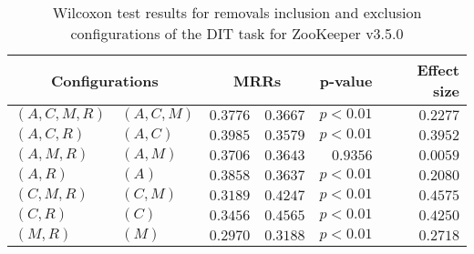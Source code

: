 
\begin{table}
\begin{spacing}{1.2}
\centering
\caption{Wilcoxon test results for removals inclusion and exclusion configurations of the DIT task for ZooKeeper v3.5.0}
\label{table:versus-wilcox-zookeeper-dit-removals}
\begin{tabular}{ll|rr|rr}
\toprule
      \multicolumn{2}{c|}{Configurations} &          \multicolumn{2}{c|}{MRRs} &       p-value & Effect size \\
\midrule
 $(A,C,M,R)$ &  $(A,C,M)$ & $0.3776$ & $0.3667$ & $p<0.01$ &    $0.2277$ \\
   $(A,C,R)$ &    $(A,C)$ & $0.3985$ & $0.3579$ & $p<0.01$ &    $0.3952$ \\
   $(A,M,R)$ &    $(A,M)$ & $0.3706$ & $0.3643$ & $0.9356$ &    $0.0059$ \\
     $(A,R)$ &      $(A)$ & $0.3858$ & $0.3637$ & $p<0.01$ &    $0.2080$ \\
   $(C,M,R)$ &    $(C,M)$ & $0.3189$ & $0.4247$ & $p<0.01$ &    $0.4575$ \\
     $(C,R)$ &      $(C)$ & $0.3456$ & $0.4565$ & $p<0.01$ &    $0.4250$ \\
     $(M,R)$ &      $(M)$ & $0.2970$ & $0.3188$ & $p<0.01$ &    $0.2718$ \\
\bottomrule
\end{tabular}

\end{spacing}
\end{table}

